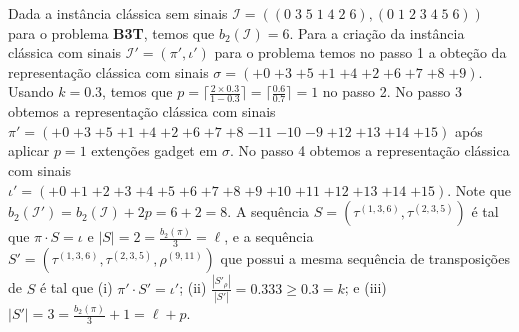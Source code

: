 \begin{example}\label{example:NDFPEMFC}
  Dada a instância clássica sem sinais $\mathcal{I} = ((0 \; 3 \; 5 \; 1 \; 4 \; 2 \; 6),(0 \; 1 \; 2 \; 3 \; 4 \; 5 \; 6))$ para o problema \textbf{B3T}, temos que $b_2(\mathcal{I}) = 6$. Para a criação da instância clássica com sinais $\mathcal{I'}=(\pi',\iota')$ para o problema \SbPRT{} temos no passo 1 a obteção da representação clássica com sinais $\sigma = ({+0} \; {+3} \; {+5} \; {+1} \; {+4} \; {+2} \; {+6} \; {+7} \; {+8} \; {+9})$. Usando $k = 0.3$, temos que $p = \lceil\frac{2\times 0.3}{1 - 0.3}\rceil = \lceil\frac{0.6}{0.7}\rceil = 1$ no passo 2. No passo 3 obtemos a representação clássica com sinais $\pi' = ({+0} \; {+3} \; {+5} \; {+1} \; {+4} \; {+2} \; {+6} \; {+7} \; {+8} \; {-11} \; {-10} \; {-9} \; {+12} \; {+13} \; {+14} \; {+15})$ após aplicar $p = 1$ extenções gadget em $\sigma$. No passo 4 obtemos a representação clássica com sinais $\iota' = ({+0} \; {+1} \; {+2} \; {+3} \; {+4} \; {+5} \; {+6} \; {+7} \; {+8} \; {+9} \; {+10} \; {+11} \; {+12} \; {+13} \; {+14} \; {+15})$. Note que $b_2(\mathcal{I'}) = b_2(\mathcal{I}) + 2p = 6 + 2 = 8$. A sequência $S = (\tau^{(1,3,6)},\tau^{(2,3,5)})$ é tal que $\pi \cdot S = \iota$ e $|S| = 2 = \frac{b_2(\pi)}{3} = \ell$, e a sequência $S' = (\tau^{(1,3,6)},\tau^{(2,3,5)},\rho^{(9,11)})$ que possui a mesma sequência de transposições de $S$ é tal que (i) $\pi' \cdot S' = \iota'$; (ii) $\frac{|S'_\rho|}{|S'|} = 0.333 \ge 0.3 = k$; e (iii) $|S'| = 3 = \frac{b_2(\pi)}{3} + 1 = \ell+p$.
\end{example}
